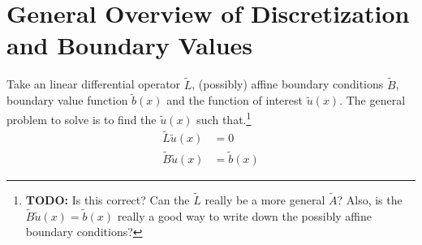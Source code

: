 \documentclass[11pt]{article}
\begin{document}
	\section{General Overview of Discretization and Boundary Values}\label{sec:general}
	Take an linear differential operator $\tilde{L}$, (possibly) affine boundary conditions $\tilde{B}$, boundary value function $\tilde{b}(x)$ and the function of interest $\tilde{u}(x)$.  The general problem to solve is to find the $\tilde{u}(x)$ such that.\footnote{\textbf{TODO:} Is this correct? Can the $\tilde{L}$ really be a more general $\tilde{A}$?  Also, is the $\tilde{B}\tilde{u}(x) = \tilde{b}(x)$ really a good way to write down the possibly affine boundary conditions?}
	\begin{align}
		\tilde{L} \tilde{u}(x) &= 0\label{eq:L-u-DE}\\
		\tilde{B} \tilde{u}(x) &= \tilde{b}(x)\label{eq:B-u-DE}
	\end{align}
\end{document}
